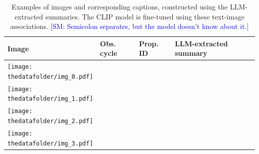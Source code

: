 \documentclass[10pt]{article} %
\newcommand{\SM}[1]{\textcolor{blue}{[SM: #1]}}
\newcommand{\datafolder}[1]{\def\thedatafolder{#1}}
\begin{document}
\datafolder{./plots/data/}
 
\begin{table}[h!]
      \centering
      \begin{tabular}{m{} p{1.9cm} p{1.9cm} m{8cm}}
          \toprule
          \centering \bfseries Image & \centering \bfseries Obs. cycle & \centering \bfseries Prop. ID & \centering \bfseries LLM-extracted summary \tabularnewline
          \midrule
          \centering \texttt{[image: \\thedatafolder/img\_0.pdf]} & \centering  & \centering  &  {\scriptsize } \tabularnewline
          \midrule
          \centering \texttt{[image: \\thedatafolder/img\_1.pdf]} & \centering  & \centering  &  {\scriptsize } \tabularnewline
          \midrule
          \centering \texttt{[image: \\thedatafolder/img\_2.pdf]} & \centering  & \centering  &  {\scriptsize } \tabularnewline
          \midrule
          \centering \texttt{[image: \\thedatafolder/img\_3.pdf]} & \centering  & \centering  &  {\scriptsize } \tabularnewline
          \bottomrule
      \end{tabular}
      \caption{Examples of images and corresponding captions, constructed using the LLM-extracted summaries.
%
The CLIP model is fine-tuned using these text-image associations. \SM{Semicolon separates, but the model doesn't know about it.}}
      \label{tab:dataset}
  \end{table}
\end{document}
